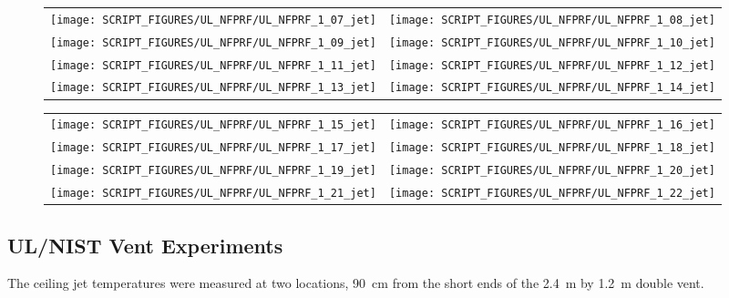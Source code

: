 \newpage

\begin{figure}[p]
\begin{tabular*}{\textwidth}{l@{\extracolsep{\fill}}r}
\texttt{[image: SCRIPT\_FIGURES/UL\_NFPRF/UL\_NFPRF\_1\_07\_jet]} &
\texttt{[image: SCRIPT\_FIGURES/UL\_NFPRF/UL\_NFPRF\_1\_08\_jet]} \\
\texttt{[image: SCRIPT\_FIGURES/UL\_NFPRF/UL\_NFPRF\_1\_09\_jet]} &
\texttt{[image: SCRIPT\_FIGURES/UL\_NFPRF/UL\_NFPRF\_1\_10\_jet]} \\
\texttt{[image: SCRIPT\_FIGURES/UL\_NFPRF/UL\_NFPRF\_1\_11\_jet]} &
\texttt{[image: SCRIPT\_FIGURES/UL\_NFPRF/UL\_NFPRF\_1\_12\_jet]} \\
\texttt{[image: SCRIPT\_FIGURES/UL\_NFPRF/UL\_NFPRF\_1\_13\_jet]} &
\texttt{[image: SCRIPT\_FIGURES/UL\_NFPRF/UL\_NFPRF\_1\_14\_jet]}
\end{tabular*}
\label{UL_NFPRF_jet_2}
\end{figure}

\begin{figure}[p]
\begin{tabular*}{\textwidth}{l@{\extracolsep{\fill}}r}
\texttt{[image: SCRIPT\_FIGURES/UL\_NFPRF/UL\_NFPRF\_1\_15\_jet]} &
\texttt{[image: SCRIPT\_FIGURES/UL\_NFPRF/UL\_NFPRF\_1\_16\_jet]} \\
\texttt{[image: SCRIPT\_FIGURES/UL\_NFPRF/UL\_NFPRF\_1\_17\_jet]} &
\texttt{[image: SCRIPT\_FIGURES/UL\_NFPRF/UL\_NFPRF\_1\_18\_jet]} \\
\texttt{[image: SCRIPT\_FIGURES/UL\_NFPRF/UL\_NFPRF\_1\_19\_jet]} &
\texttt{[image: SCRIPT\_FIGURES/UL\_NFPRF/UL\_NFPRF\_1\_20\_jet]} \\
\texttt{[image: SCRIPT\_FIGURES/UL\_NFPRF/UL\_NFPRF\_1\_21\_jet]} &
\texttt{[image: SCRIPT\_FIGURES/UL\_NFPRF/UL\_NFPRF\_1\_22\_jet]}
\end{tabular*}
\label{UL_NFPRF_jet_3}
\end{figure}


\clearpage

\subsection{UL/NIST Vent Experiments}

The ceiling jet temperatures were measured at two locations, 90~cm from the short ends of the 2.4~m by 1.2~m double vent.

